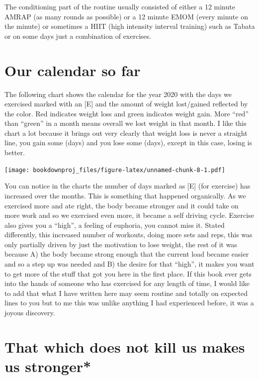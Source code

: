 \documentclass[
  oneside]{book}
\begin{document}
The conditioning part of the routine usually consisted of either a 12 minute AMRAP (as many rounds as possible) or a 12 minute EMOM (every minute on the minute) or sometimes a HIIT (high intensity interval training) such as Tabata or on some days just a combination of exercises.

\hypertarget{our-calendar-so-far}{%
\section{Our calendar so far}\label{our-calendar-so-far}}

The following chart shows the calendar for the year 2020 with the days we exercised marked with an {[}E{]} and the amount of weight lost/gained reflected by the color. Red indicates weight loss and green indicates weight gain. More ``red'' than ``green'' in a month means overall we lost weight in that month. I like this chart a lot because it brings out very clearly that weight loss is never a straight line, you gain some (days) and you lose some (days), except in this case, losing is better.

\texttt{[image: bookdownproj\_files/figure-latex/unnamed-chunk-8-1.pdf]}

You can notice in the charts the number of days marked as {[}E{]} (for exercise) has increased over the months. This is something that happened organically. As we exercised more and ate right, the body became stronger and it could take on more work and so we exercised even more, it became a self driving cycle. Exercise also gives you a ``high'', a feeling of euphoria, you cannot miss it. Stated differently, this increased number of workouts, doing more sets and reps, this was only partially driven by just the motivation to lose weight, the rest of it was because A) the body became strong enough that the current load became easier and so a step up was needed and B) the desire for that ``high'', it makes you want to get more of the stuff that got you here in the first place. If this book ever gets into the hands of someone who has exercised for any length of time, I would like to add that what I have written here may seem routine and totally on expected lines to you but to me this was unlike anything I had experienced before, it was a joyous discovery.

\hypertarget{that-which-does-not-kill-us-makes-us-stronger}{%
\section{That which does not kill us makes us stronger*}\label{that-which-does-not-kill-us-makes-us-stronger}}
\end{document}
